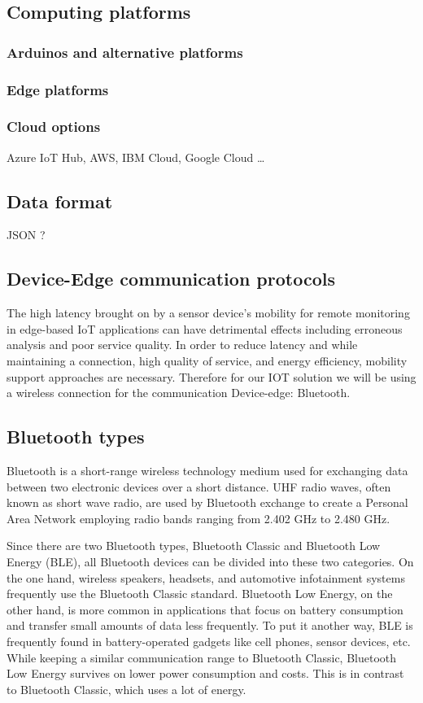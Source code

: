 \subsection{Computing platforms}
\subsubsection{Arduinos and alternative platforms}
\subsubsection{Edge platforms}
\subsubsection{Cloud options}
Azure IoT Hub, AWS, IBM Cloud, Google Cloud \dots
\subsection{Data format}
JSON ? 
\subsection{Device-Edge communication protocols}
The high latency brought on by a sensor device's mobility for remote monitoring in edge-based IoT applications can have detrimental effects including erroneous analysis and poor service quality. In order to reduce latency and while maintaining a connection, high quality of service, and energy efficiency, mobility support approaches are necessary. Therefore for our IOT solution we will be using a wireless connection for the communication Device-edge: Bluetooth. 
\subsection{Bluetooth types}
Bluetooth is a short-range wireless technology medium used for exchanging data between two electronic devices over a short distance. 
UHF radio waves, often known as short wave radio, are used by Bluetooth exchange to create a Personal Area Network employing radio bands ranging from 2.402 GHz to 2.480 GHz.

Since there are two Bluetooth types, Bluetooth Classic and Bluetooth Low Energy (BLE), all Bluetooth devices can be divided into these two categories. On the one hand, wireless speakers, headsets, and automotive infotainment systems frequently use the Bluetooth Classic standard. Bluetooth Low Energy, on the other hand, is more common in applications that focus on battery consumption and transfer small amounts of data less frequently. To put it another way, BLE is frequently found in battery-operated gadgets like cell phones, sensor devices, etc. While keeping a similar communication range to Bluetooth Classic, Bluetooth Low Energy survives on lower power consumption and costs. This is in contrast to Bluetooth Classic, which uses a lot of energy.

